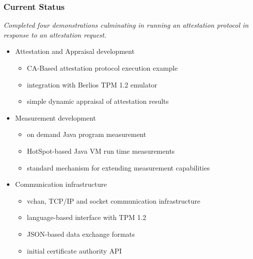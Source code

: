 \documentclass{beamer}
\begin{document}
\begin{frame}
  \frametitle{Current Status}

  \begin{center}
  \emph{\color{kublue}Completed four demonstrations culminating in
    running an attestation protocol in response to an attestation
    request.}
  \end{center}

  \begin{itemize}
  \item Attestation and Appraisal development
    \begin{itemize}
    \item CA-Based attestation protocol execution example
    \item integration with Berlios TPM 1.2 emulator
    \item simple dynamic appraisal of attestation results
    \end{itemize}
  \item Measurement development
    \begin{itemize}
    \item on demand Java program measurement
    \item HotSpot-based Java VM run time measurements
    \item standard mechanism for extending measurement capabilities
    \end{itemize}
  \item Communication infrastructure
    \begin{itemize}
    \item vchan, TCP/IP and socket communication infrastructure
    \item language-based interface with TPM 1.2
    \item JSON-based data exchange formats
    \item initial certificate authority API
    \end{itemize}
  \end{itemize}
\end{frame}
\end{document}
